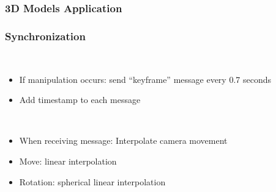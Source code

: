 \begin{frame}
  \frametitle{3D Models Application}
\end{frame}

\begin{frame}
  \frametitle{Synchronization}
  \begin{description}[]
    \item[Sender] \hfill \\
        \begin{itemize}
          \item If manipulation occurs: send ``keyframe'' message every 0.7 seconds
          \item Add timestamp to each message
        \end{itemize}
    \item[Receiver] \hfill \\
      \begin{itemize}
        \item When receiving message: Interpolate camera movement
        \item Move: linear interpolation
        \item Rotation: spherical linear interpolation
      \end{itemize}
  \end{description} 
\end{frame}

